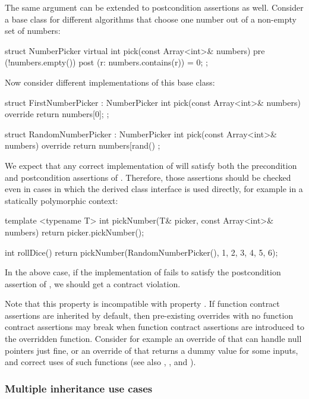The same argument can be extended to postcondition assertions as well. Consider a base class for different algorithms that choose one number out of a non-empty set of numbers:
\begin{codeblock}
struct NumberPicker {
  virtual int pick(const Array<int>& numbers)
    pre (!numbers.empty())
    post (r: numbers.contains(r)) = 0;
};
\end{codeblock}
Now consider different implementations of this base class:
\begin{codeblock}
struct FirstNumberPicker : NumberPicker {
  int pick(const Array<int>& numbers) override {
    return numbers[0];
  }
};

struct RandomNumberPicker : NumberPicker {
  int pick(const Array<int>& numbers) override {
    return numbers[rand() %
  }
};
\end{codeblock}
We expect that any correct implementation of   will satisfy both the precondition and postcondition assertions of . Therefore, those assertions should be checked even in cases in which the derived class interface is used directly, for example in a statically polymorphic context:
\begin{codeblock}
template <typename T>
int pickNumber(T& picker, const Array<int>& numbers) {
  return picker.pickNumber();
}

int rollDice() {
  return pickNumber(RandomNumberPicker(), {1, 2, 3, 4, 5, 6});
}
\end{codeblock}
In the above case, if the implementation of  fails to satisfy the postcondition assertion of , we should get a contract violation.

Note that this property is incompatible with property . If function contract assertions are inherited by default, then pre-existing overrides with no function contract assertions may break when function contract assertions are introduced to the overridden function. Consider for example an override of \allowbreak{}  that can handle null pointers just fine, or an override of \allowbreak{} that returns a dummy value for some inputs, and correct uses of such functions (see also , , and ). 
\subsubsection{Multiple inheritance use cases}

